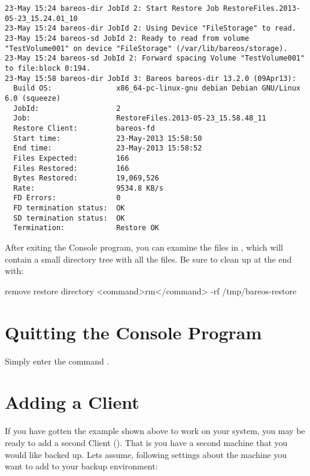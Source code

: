 \footnotesize
\begin{verbatim}
23-May 15:24 bareos-dir JobId 2: Start Restore Job RestoreFiles.2013-05-23_15.24.01_10
23-May 15:24 bareos-dir JobId 2: Using Device "FileStorage" to read.
23-May 15:24 bareos-sd JobId 2: Ready to read from volume "TestVolume001" on device "FileStorage" (/var/lib/bareos/storage).
23-May 15:24 bareos-sd JobId 2: Forward spacing Volume "TestVolume001" to file:block 0:194.
23-May 15:58 bareos-dir JobId 3: Bareos bareos-dir 13.2.0 (09Apr13):
  Build OS:               x86_64-pc-linux-gnu debian Debian GNU/Linux 6.0 (squeeze)
  JobId:                  2
  Job:                    RestoreFiles.2013-05-23_15.58.48_11
  Restore Client:         bareos-fd
  Start time:             23-May-2013 15:58:50
  End time:               23-May-2013 15:58:52
  Files Expected:         166
  Files Restored:         166
  Bytes Restored:         19,069,526
  Rate:                   9534.8 KB/s
  FD Errors:              0
  FD termination status:  OK
  SD termination status:  OK
  Termination:            Restore OK
\end{verbatim}
\normalsize

After exiting the Console program, you can examine the files in ,
which will contain a small directory tree with all the
files. Be sure to clean up at the end with:

\begin{commands}{remove restore directory}
<command>rm</command> -rf /tmp/bareos-restore
\end{commands}

\section{Quitting the Console Program}

Simply enter the command .

\section{Adding a Client}
\label{SecondClient}
\label{sec:AddAClient}

If you have gotten the example shown above to work on your system, you may be
ready to add a second Client (\bareosFd). That is you have a second machine
that you would like backed up.
Lets assume, following settings about the machine you want to add to your backup environment:

